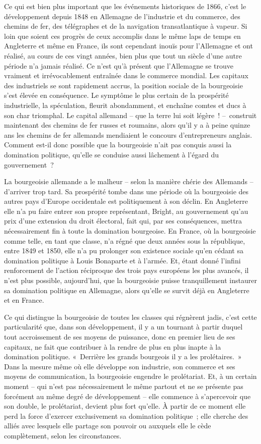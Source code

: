 \documentclass[french,twoside]{book} %
\begin{document}
Ce qui est bien plus important que les événements historiques de 1866, c’est le développement depuis 1848 en Allemagne de l’industrie et du commerce, des chemins de fer, des télégraphes et de la navigation transatlantique à vapeur. Si loin que soient ces progrès de ceux accomplis dans le même laps de temps en Angleterre et même en France, ils sont cependant inouïs pour l’Allemagne et ont réalisé, au cours de ces vingt années, bien plus que tout un siècle d’une autre période n’a jamais réalisé. Ce n’est qu’à présent que l’Allemagne se trouve vraiment et irrévocablement entraînée dans le commerce mondial. Les capitaux des industriels se sont rapidement accrus, la position sociale de la bourgeoisie s’est élevée en conséquence. Le symptôme le plus certain de la prospérité industrielle, la spéculation, fleurit abondamment, et enchaîne comtes et ducs à son char triomphal. Le capital allemand – que la terre lui soit légère ! – construit maintenant des chemins de fer russes et roumains, alors qu’il y a à peine quinze ans les chemins de fer allemands mendiaient le concours d’entrepreneurs anglais. Comment est-il donc possible que la bourgeoisie n’ait pas conquis aussi la domination politique, qu’elle se conduise aussi lâchement à l’égard du gouvernement ?\par
La bourgeoisie allemande a le malheur – selon la manière chérie des Allemands – d’arriver trop tard. Sa prospérité tombe dans une période où la bourgeoisie des autres pays d’Europe occidentale est politiquement à son déclin. En Angleterre elle n’a pu faire entrer son propre représentant, Bright, au gouvernement qu’au prix d’une extension du droit électoral, fait qui, par ses conséquences, mettra nécessairement fin à toute la domination bourgeoise. En France, où la bourgeoisie comme telle, en tant que classe, n’a régné que deux années sous la république, entre 1849 et 1850, elle n’a pu prolonger son existence sociale qu’en cédant sa domination politique à Louis Bonaparte et à l’armée. Et, étant donné l’infini renforcement de l’action réciproque des trois pays européens les plus avancés, il n’est plus possible, aujourd’hui, que la bourgeoisie puisse tranquillement instaurer sa domination politique en Allemagne, alors qu’elle se survit déjà en Angleterre et en France.\par
Ce qui distingue la bourgeoisie de toutes les classes qui régnèrent jadis, c’est cette particularité que, dans son développement, il y a un tournant à partir duquel tout accroissement de ses moyens de puissance, donc en premier lieu de ses capitaux, ne fait que contribuer à la rendre de plus en plus inapte à la domination politique. « Derrière les grands bourgeois il y a les prolétaires. » Dans la mesure même où elle développe son industrie, son commerce et ses moyens de communication, la bourgeoisie engendre le prolétariat. Et, à un certain moment – qui n’est pas nécessairement le même partout et ne se présente pas forcément au même degré de développement – elle commence à s’apercevoir que son double, le prolétariat, devient plus fort qu’elle. À partir de ce moment elle perd la force d’exercer exclusivement sa domination politique ; elle cherche des alliés avec lesquels elle partage son pouvoir ou auxquels elle le cède complètement, selon les circonstances.\par
\end{document}
